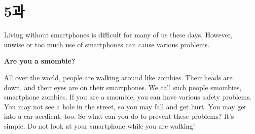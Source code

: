 \documentclass[9pt, a4paper]{oblivoir}
\begin{document}
            






            












    \newpage

    \section*{5과}

    Living without smartphones is difficult for many of us these days. However, unwise or
    too much use of smartphones can cause various problems. \newline
    
    \noindent
    \textbf{Are you a smombie?}

    All over the world, people are walking around like zombies. Their heads are down, and their
    eyes are on their smartphones. 
    We call such people smombies, smartphone zombies. 
    If you are a smombie, you can have various safety problems. 
    You may not see a hole in the street, so you may fall and get hurt. 
    You may get into a car accdient, too. So what can you do to prevent these problems? 
    It's simple. Do not look at your smartphone while you are walking! \newline
\end{document}
